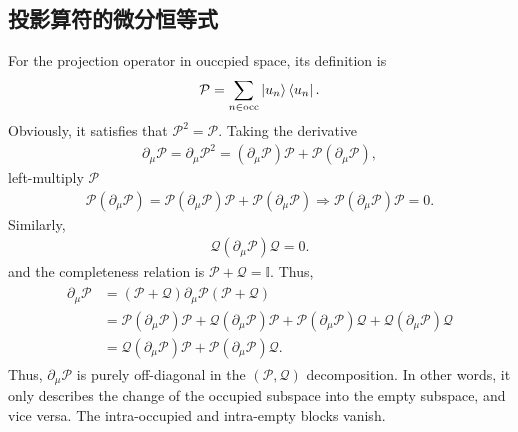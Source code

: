 \documentclass[10pt, oneside]{article}
\newcommand{\pa}{\partial}
\newcommand{\mr}[1]{\mathrm{#1}}
\newcommand{\p}[1]{\left(#1\right)}
\begin{document}
\subsection{投影算符的微分恒等式}
For the projection operator in ouccpied space, its definition is 
\begin{align}
	\mathcal{P} = \sum_{n \in \mr{occ}} \ket{u_n}\bra{u_n}.
\end{align}
Obviously, it satisfies that \(\mathcal{P}^2 = \mathcal{P}\). Taking the derivative 
\begin{align}
	\pa_{\mu} \mathcal{P} = \pa_{\mu} \mathcal{P}^2 = \p{\pa_{\mu} \mathcal{P}} \mathcal{P} + \mathcal{P} \p{\pa_{\mu} \mathcal{P}},
\end{align}
left-multiply \(\mathcal{P}\)
\begin{align}
	\mathcal{P} \p{\pa_{\mu} \mathcal{P}} = \mathcal{P} \p{\pa_{\mu} \mathcal{P}} \mathcal{P} + \mathcal{P} \p{\pa_{\mu} \mathcal{P}} \Rightarrow \mathcal{P} \p{\pa_{\mu} \mathcal{P}} \mathcal{P} =0.
\end{align}
Similarly,
\begin{align}
	 \mathcal{Q} \p{\pa_{\mu} \mathcal{P}} \mathcal{Q} =0.
\end{align}
and the completeness relation is \(\mathcal{P} + \mathcal{Q} = \mathbb{I}\). Thus, 
\begin{align}
	\begin{split}
		\pa_{\mu} \mathcal{P} & = \p{\mathcal{P} + \mathcal{Q} }  \pa_{\mu} \mathcal{P} \p{\mathcal{P} + \mathcal{Q} } \\
		& = \mathcal{P} \p{\pa_{\mu} \mathcal{P}} \mathcal{P} + \mathcal{Q} \p{\pa_{\mu} \mathcal{P}} \mathcal{P} + \mathcal{P} \p{\pa_{\mu} \mathcal{P}} \mathcal{Q} + \mathcal{Q} \p{\pa_{\mu} \mathcal{P}} \mathcal{Q} \\
		& = \mathcal{Q} \p{\pa_{\mu} \mathcal{P}} \mathcal{P} + \mathcal{P} \p{\pa_{\mu} \mathcal{P}} \mathcal{Q}.
	\end{split}
\end{align}
Thus, \(\pa_{\mu}\mathcal{P}\) is purely off-diagonal in the
\(\p{\mathcal{P},\mathcal{Q}}\) decomposition. In other words, it only describes the change of the occupied subspace into the empty subspace, and vice versa. The intra-occupied and intra-empty blocks vanish.
\end{document}
